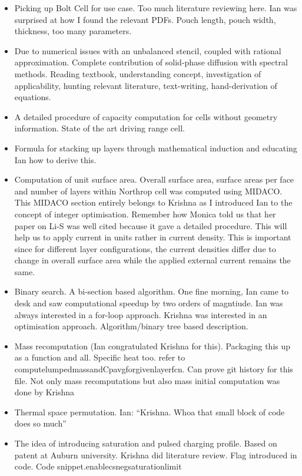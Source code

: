 \begin{itemize}
    \item Picking up Bolt Cell for use case. Too much literature reviewing here. Ian was surprised at how I found the relevant PDFs. Pouch length, pouch width, thickness, too many parameters.
    \item Due to numerical issues with an unbalanced stencil, coupled with rational approximation. Complete contribution of solid-phase diffusion with spectral methods. Reading textbook, understanding concept, investigation of applicability, hunting relevant literature, text-writing, hand-derivation of equations.
    \item A detailed procedure of capacity computation for cells without geometry information. State of the art driving range cell.
    \item Formula for stacking up layers through mathematical induction and educating Ian how to derive this.
    \item Computation of unit surface area. Overall surface area, surface areas per face and number of layers within Northrop cell was computed using MIDACO. This MIDACO section entirely belongs to Krishna as I introduced Ian to the concept of integer optimisation. Remember how Monica told us that her paper on Li-S was well cited because it gave a detailed procedure. This will help us to apply current in units rather in current density. This is important since for different layer configurations, the current densities differ due to change in overall surface area while the applied external current remains the same.
    \item Binary search. A bi-section based algorithm. One fine morning, Ian came to desk and saw computational speedup by two orders of magntiude. Ian was always interested in a for-loop approach. Krishna was interested in an optimisation approach. Algorithm/binary tree based description.
    \item Mass recomputation (Ian congratulated Krishna for this). Packaging this up as a function and all. Specific heat too. refer to computelumpedmassandCpavgforgivenlayerfcn. Can prove git history for this file. Not only mass recomputations but also mass initial computation was done by Krishna
    \item Thermal space permutation. Ian: ``Krishna. Whoa that small block of code does so much''
    \item The idea of introducing saturation and pulsed charging profile. Based on patent at Auburn university. Krishna did literature review. Flag introduced in code. Code snippet.enablecsnegsaturationlimit

\end{itemize}
